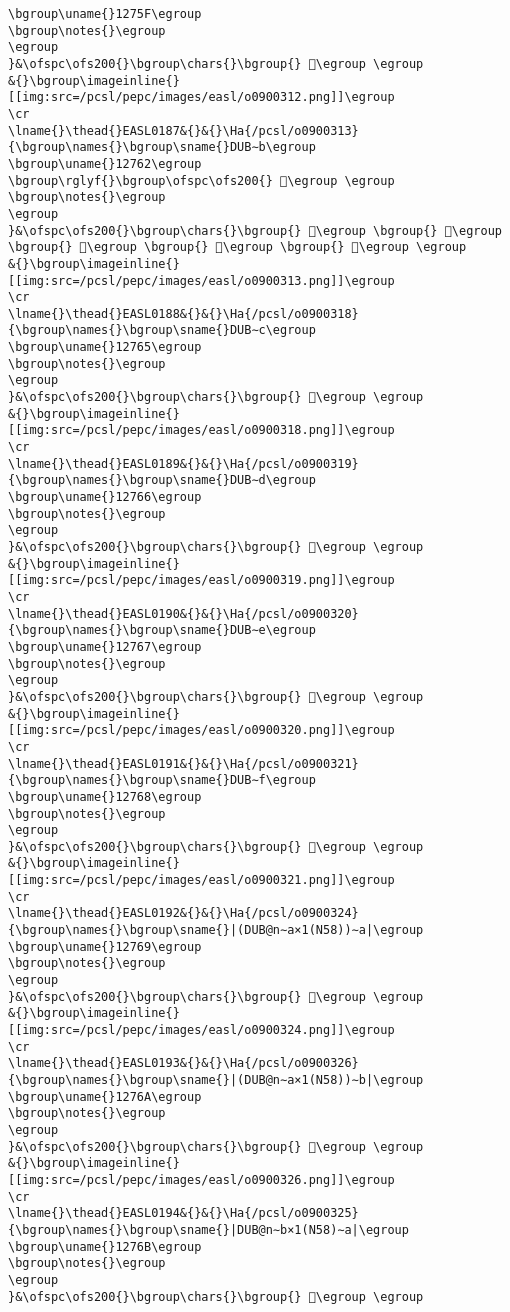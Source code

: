 \begin{verbatim}
\bgroup\uname{}1275F\egroup
\bgroup\notes{}\egroup
\egroup
}&\ofspc\ofs200{}\bgroup\chars{}\bgroup{} 𒝟\egroup \egroup
&{}\bgroup\imageinline{}[[img:src=/pcsl/pepc/images/easl/o0900312.png]]\egroup
\cr
\lname{}\thead{}EASL0187&{}&{}\Ha{/pcsl/o0900313}{\bgroup\names{}\bgroup\sname{}DUB∼b\egroup
\bgroup\uname{}12762\egroup
\bgroup\rglyf{}\bgroup\ofspc\ofs200{} 𒝢\egroup \egroup
\bgroup\notes{}\egroup
\egroup
}&\ofspc\ofs200{}\bgroup\chars{}\bgroup{} 𒝡\egroup \bgroup{} 𒝠\egroup \bgroup{} 𒝣\egroup \bgroup{} 𒝢\egroup \bgroup{} 𒝤\egroup \egroup
&{}\bgroup\imageinline{}[[img:src=/pcsl/pepc/images/easl/o0900313.png]]\egroup
\cr
\lname{}\thead{}EASL0188&{}&{}\Ha{/pcsl/o0900318}{\bgroup\names{}\bgroup\sname{}DUB∼c\egroup
\bgroup\uname{}12765\egroup
\bgroup\notes{}\egroup
\egroup
}&\ofspc\ofs200{}\bgroup\chars{}\bgroup{} 𒝥\egroup \egroup
&{}\bgroup\imageinline{}[[img:src=/pcsl/pepc/images/easl/o0900318.png]]\egroup
\cr
\lname{}\thead{}EASL0189&{}&{}\Ha{/pcsl/o0900319}{\bgroup\names{}\bgroup\sname{}DUB∼d\egroup
\bgroup\uname{}12766\egroup
\bgroup\notes{}\egroup
\egroup
}&\ofspc\ofs200{}\bgroup\chars{}\bgroup{} 𒝦\egroup \egroup
&{}\bgroup\imageinline{}[[img:src=/pcsl/pepc/images/easl/o0900319.png]]\egroup
\cr
\lname{}\thead{}EASL0190&{}&{}\Ha{/pcsl/o0900320}{\bgroup\names{}\bgroup\sname{}DUB∼e\egroup
\bgroup\uname{}12767\egroup
\bgroup\notes{}\egroup
\egroup
}&\ofspc\ofs200{}\bgroup\chars{}\bgroup{} 𒝧\egroup \egroup
&{}\bgroup\imageinline{}[[img:src=/pcsl/pepc/images/easl/o0900320.png]]\egroup
\cr
\lname{}\thead{}EASL0191&{}&{}\Ha{/pcsl/o0900321}{\bgroup\names{}\bgroup\sname{}DUB∼f\egroup
\bgroup\uname{}12768\egroup
\bgroup\notes{}\egroup
\egroup
}&\ofspc\ofs200{}\bgroup\chars{}\bgroup{} 𒝨\egroup \egroup
&{}\bgroup\imageinline{}[[img:src=/pcsl/pepc/images/easl/o0900321.png]]\egroup
\cr
\lname{}\thead{}EASL0192&{}&{}\Ha{/pcsl/o0900324}{\bgroup\names{}\bgroup\sname{}|(DUB@n∼a×1(N58))∼a|\egroup
\bgroup\uname{}12769\egroup
\bgroup\notes{}\egroup
\egroup
}&\ofspc\ofs200{}\bgroup\chars{}\bgroup{} 𒝩\egroup \egroup
&{}\bgroup\imageinline{}[[img:src=/pcsl/pepc/images/easl/o0900324.png]]\egroup
\cr
\lname{}\thead{}EASL0193&{}&{}\Ha{/pcsl/o0900326}{\bgroup\names{}\bgroup\sname{}|(DUB@n∼a×1(N58))∼b|\egroup
\bgroup\uname{}1276A\egroup
\bgroup\notes{}\egroup
\egroup
}&\ofspc\ofs200{}\bgroup\chars{}\bgroup{} 𒝪\egroup \egroup
&{}\bgroup\imageinline{}[[img:src=/pcsl/pepc/images/easl/o0900326.png]]\egroup
\cr
\lname{}\thead{}EASL0194&{}&{}\Ha{/pcsl/o0900325}{\bgroup\names{}\bgroup\sname{}|DUB@n∼b×1(N58)∼a|\egroup
\bgroup\uname{}1276B\egroup
\bgroup\notes{}\egroup
\egroup
}&\ofspc\ofs200{}\bgroup\chars{}\bgroup{} 𒝫\egroup \egroup

\end{verbatim}
